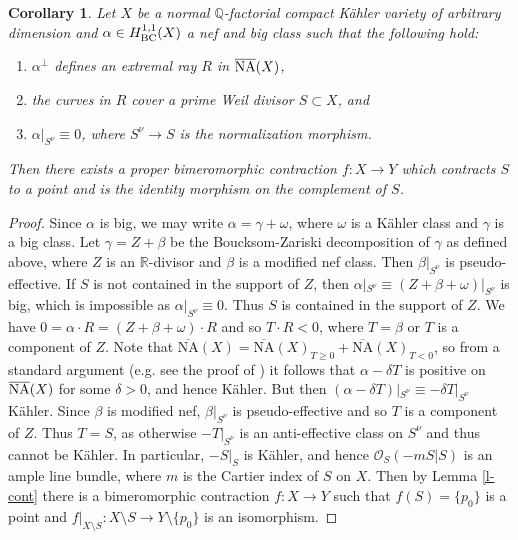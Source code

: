 \documentclass[12pt]{amsart}
\theoremstyle{plain}
\newtheorem{corollary}[theorem]{Corollary}
\theoremstyle{remark}
\theoremstyle{definition}
\def\NA{\overline{\operatorname{NA}}}
\newcommand{\<}{\leq}
\def\>{\geq}
\newcommand{\mbR}{\mathbb{R}}
\def\mcO{\mathcal{O}}
\newcommand{\Q}{{\mathbb{Q}}}
\def\>{\geq}
\def\mcO{\mathcal{O}}
\def\NA{\operatorname{\overline{NA}}}
\theoremstyle{definition}
\theoremstyle{definition}
\numberwithin{equation}{section}
\theoremstyle{remark}
\begin{document}
\begin{corollary}\label{c-1}
Let $X$ be a normal $\Q$-factorial compact K\"ahler variety of arbitrary dimension and 
$\alpha\in H^{1,1}_{\rm BC}(X)$ a nef and big class such that the following hold:
\begin{enumerate}
\item $\alpha ^\perp$ defines an extremal ray $R$ in $\overline{\rm NA}(X)$, 
\item the curves in $R$ cover a prime Weil divisor $S\subset X$, and 
\item $\alpha |_{S^\nu}\equiv 0$, where $S^\nu\to S$ is the normalization morphism. 
\end{enumerate}
Then there exists a proper bimeromorphic contraction  $f:X\to Y$ which contracts $S$ to a point and is the identity morphism on the complement of $S$.


\end{corollary}



\begin{proof}
Since $\alpha$ is big, we may write $\alpha=\gamma +\omega$, where $\omega $ is a K\"ahler class and $\gamma$ is a big class. Let $\gamma=Z+\beta$ be the Boucksom-Zariski decomposition of $\gamma$ as defined above, where $Z$ is an $\mbR$-divisor and $\beta$ is a modified nef class. Then $\beta |_{S^\nu}$ is pseudo-effective.  If $S$ is not contained in the support of $Z$, then $\alpha |_{S^\nu} \equiv (Z+\beta+\omega)|_{S^\nu}$ is big, which is impossible as $ \alpha |_{S^\nu} \equiv 0$.
Thus $S$ is  contained in the support of $Z$. We have $0= \alpha \cdot R = (Z+\beta+\omega)\cdot R$ and so $T\cdot R<0$, where $T=\beta$ or $T$ is a component  of $Z$. Note that $\NA(X)=\NA(X)_{T\>0}+\NA(X)_{T<0}$, so from a standard argument (e.g. see the proof of \cite[Claim 3.25]{DHY23}) it follows that $\alpha -\delta T$ is positive on $\overline{\rm NA}(X)$ for some $\delta>0$, and hence K\"ahler. But then $(\alpha -\delta T)|_{S^\nu}\equiv -\delta T|_{S^\nu}$ K\"ahler. 
Since $\beta$ is modified nef, $\beta|_{S^\nu}$ is pseudo-effective and so $T$ is a component  of $Z$.  
Thus $T=S$, as otherwise $-T|_{S^\nu}$ is an anti-effective class on $S^\nu$ and thus cannot be K\"ahler. In particular,  $-S|_S$ is K\"ahler, and hence $\mcO_S(-mS|S)$ is an ample line bundle, where $m$ is the Cartier index of $S$ on $X$. Then by Lemma \ref{l-cont} there is a bimeromorphic contraction $f:X\to Y$ such that $f(S)=\{p_0\}$ is a point and $f|_{X\setminus S}: X\setminus S\to Y\setminus \{p_0\}$ is an isomorphism.

\end{proof}
\end{document}

